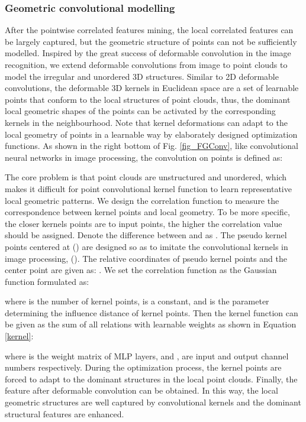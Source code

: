 \documentclass[journal]{IEEEtran}
\begin{document}
\subsubsection{Geometric convolutional modelling}
After the pointwise correlated features mining, the local correlated features can be largely captured, but the geometric structure of points can not be sufficiently modelled.
Inspired by the great success of deformable convolution in the image recognition\cite{zhu2019deformable}, we extend deformable convolutions from image to point clouds to model the irregular and unordered 3D structures. Similar to 2D deformable convolutions, the deformable 3D kernels in Euclidean space are a set of learnable points that conform to the local structures of point clouds, thus, the dominant local geometric shapes of the points can be activated by the corresponding kernels in the neighbourhood. Note that kernel deformations can adapt to the local geometry of points in a learnable way by elaborately designed optimization functions.
As shown in the right bottom of Fig. \ref{fig_FGConv}, like convolutional neural networks in image processing, the convolution on points is defined as:

The core problem is that point clouds are unstructured and unordered, which makes it difficult for point convolutional kernel function  to learn representative local geometric patterns. We design the correlation function to measure the correspondence between kernel points and local geometry. To be more specific, the closer kernels points are to input points, the higher the correlation value should be assigned. Denote the difference between  and  as . The  pseudo kernel points   centered at  () are designed so as to imitate the convolutional kernels in image processing, (). The relative coordinates of pseudo kernel points  and the center point  are given as: . We set the correlation function  as the Gaussian function formulated as:

where  is the number of kernel points,  is a constant, and  is the parameter determining the influence distance of kernel points. Then the kernel function can be given as the sum of all relations with learnable weights as shown in Equation \ref{kernel}:

where  is the weight matrix of MLP layers, and ,  are input and output channel numbers respectively. During the optimization process, the kernel points are forced to adapt to the dominant structures in the local point clouds. Finally, the feature after deformable convolution   can be obtained. In this way, the local geometric structures are well captured by convolutional kernels and the dominant structural features are enhanced.
\end{document}
